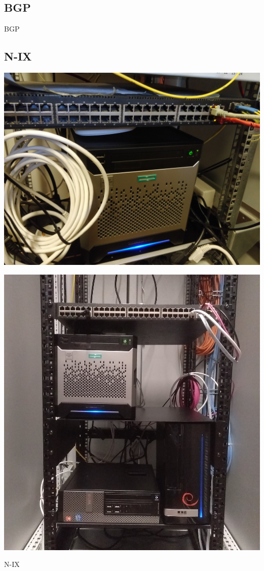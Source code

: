 \documentclass{beamer}
\begin{document}
	\subsection{BGP}
	\begin{frame}{BGP}
	\end{frame}

	\subsection{N-IX}
	\begin{frame}
		\centering
		\includegraphics[width=\framewidth]{media/zbau-server.jpg}
	\end{frame}
	\begin{frame}
		\centering
		\includegraphics[height=\textheight]{media/zbau-server-neu.jpg}
	\end{frame}
	\begin{frame}{N-IX}
	\end{frame}
\end{document}
